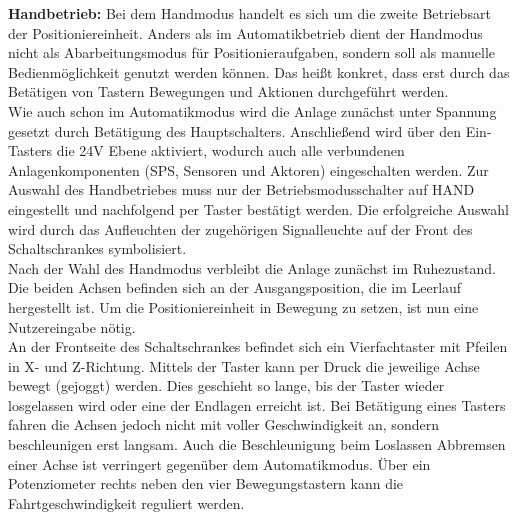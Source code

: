 \documentclass[../Bachelorarbeit.tex]{subfiles}
\begin{document}
\smallskip
\newline
\textbf{Handbetrieb:} Bei dem Handmodus handelt es sich um die zweite Betriebsart der Positioniereinheit. Anders als im Automatikbetrieb dient der Handmodus nicht als Abarbeitungsmodus für Positionieraufgaben, sondern soll als manuelle Bedienmöglichkeit genutzt werden können. Das heißt konkret, dass erst durch das Betätigen von Tastern Bewegungen und Aktionen durchgeführt werden.\\
Wie auch schon im Automatikmodus wird die Anlage zunächst unter Spannung gesetzt durch Betätigung des Hauptschalters. Anschließend wird über den Ein-Tasters die 24V Ebene aktiviert, wodurch auch alle verbundenen Anlagenkomponenten (SPS, Sensoren und Aktoren) eingeschalten werden. Zur Auswahl des Handbetriebes muss nur der Betriebsmodusschalter auf \glqq HAND\grqq{} eingestellt und nachfolgend per Taster bestätigt werden. Die erfolgreiche Auswahl wird durch das Aufleuchten der zugehörigen Signalleuchte auf der Front des Schaltschrankes symbolisiert.\\
Nach der Wahl des Handmodus verbleibt die Anlage zunächst im Ruhezustand. Die beiden Achsen befinden sich an der Ausgangsposition, die im Leerlauf hergestellt ist. Um die Positioniereinheit in Bewegung zu setzen, ist nun eine Nutzereingabe nötig.\\
An der Frontseite des Schaltschrankes befindet sich ein Vierfachtaster mit Pfeilen in X- und Z-Richtung. Mittels der Taster kann per Druck die jeweilige Achse bewegt (gejoggt) werden. Dies geschieht so lange, bis der Taster wieder losgelassen wird oder eine der Endlagen erreicht ist. Bei Betätigung eines Tasters fahren die Achsen jedoch nicht mit voller Geschwindigkeit an, sondern beschleunigen erst langsam. Auch die Beschleunigung beim Loslassen \bzw Abbremsen einer Achse ist verringert gegenüber dem Automatikmodus. Über ein Potenziometer rechts neben den vier Bewegungstastern kann die Fahrtgeschwindigkeit reguliert werden.\\
\end{document}
